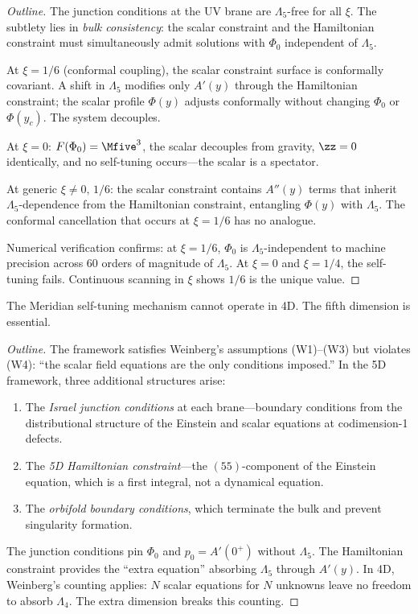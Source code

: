 \begin{proof}[Outline]
The junction conditions at the UV brane are $\Lambda_5$-free for all $\xi$. The subtlety lies in \emph{bulk consistency}: the scalar constraint and the Hamiltonian constraint must simultaneously admit solutions with $\Phi_0$ independent of $\Lambda_5$.

At $\xi = 1/6$ (conformal coupling), the scalar constraint surface is conformally covariant. A shift in $\Lambda_5$ modifies only $A'(y)$ through the Hamiltonian constraint; the scalar profile $\Phi(y)$ adjusts conformally without changing $\Phi_0$ or $\Phi(y_c)$. The system decouples.

At $\xi = 0$: $F(\Phi_0) = \Mfive^3$, the scalar decouples from gravity, $\zz = 0$ identically, and no self-tuning occurs---the scalar is a spectator.

At generic $\xi \neq 0,\,1/6$: the scalar constraint contains $A''(y)$ terms that inherit $\Lambda_5$-dependence from the Hamiltonian constraint, entangling $\Phi(y)$ with $\Lambda_5$. The conformal cancellation that occurs at $\xi = 1/6$ has no analogue.

Numerical verification confirms: at $\xi = 1/6$, $\Phi_0$ is $\Lambda_5$-independent to machine precision across 60 orders of magnitude of $\Lambda_5$. At $\xi = 0$ and $\xi = 1/4$, the self-tuning fails. Continuous scanning in $\xi$ shows $1/6$ is the unique value. \qedhere
\end{proof}

\begin{theorem}
\label{thm:1-5D-necessity}
The Meridian self-tuning mechanism cannot operate in 4D. The fifth dimension is essential.
\end{theorem}

\begin{proof}[Outline]
The framework satisfies Weinberg's assumptions (W1)--(W3) but violates (W4): ``the scalar field equations are the only conditions imposed.'' In the 5D framework, three additional structures arise:
\begin{enumerate}
\item The \emph{Israel junction conditions} at each brane---boundary conditions from the distributional structure of the Einstein and scalar equations at codimension-1 defects.
\item The \emph{5D Hamiltonian constraint}---the $(55)$-component of the Einstein equation, which is a first integral, not a dynamical equation.
\item The \emph{orbifold boundary conditions}, which terminate the bulk and prevent singularity formation.
\end{enumerate}
The junction conditions pin $\Phi_0$ and $p_0 = A'(0^+)$ without $\Lambda_5$. The Hamiltonian constraint provides the ``extra equation'' absorbing $\Lambda_5$ through $A'(y)$. In 4D, Weinberg's counting applies: $N$ scalar equations for $N$ unknowns leave no freedom to absorb $\Lambda_4$. The extra dimension breaks this counting. \qedhere
\end{proof}

